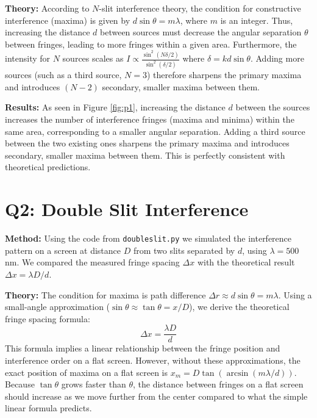 \documentclass{article}
\begin{document}
\textbf{Theory:} According to $N$-slit interference theory, the condition for constructive interference (maxima) is given by $d \sin \theta = m \lambda$, where $m$ is an integer. Thus, increasing the distance $d$ between sources must decrease the angular separation $\theta$ between fringes, leading to more fringes within a given area. Furthermore, the intensity for $N$ sources scales as $I \propto \frac{\sin^2(N \delta/2)}{\sin^2(\delta/2)}$ where $\delta = kd \sin\theta$. Adding more sources (such as a third source, $N=3$) therefore sharpens the primary maxima and introduces $(N-2)$ secondary, smaller maxima between them.

\textbf{Results:} As seen in Figure \ref{fig:p1}, increasing the distance $d$ between the sources increases the number of interference fringes (maxima and minima) within the same area, corresponding to a smaller angular separation. Adding a third source between the two existing ones sharpens the primary maxima and introduces secondary, smaller maxima between them. This is perfectly consistent with theoretical predictions.

\section*{Q2: Double Slit Interference}

\textbf{Method:} Using the code from \texttt{doubleslit.py} we simulated the interference pattern on a screen at distance $D$ from two slits separated by $d$, using $\lambda = 500$ nm. We compared the measured fringe spacing $\Delta x$ with the theoretical result $\Delta x = \lambda D / d$.

\textbf{Theory:} The condition for maxima is path difference $\Delta r \approx d \sin \theta = m \lambda$. Using a small-angle approximation ($\sin \theta \approx \tan \theta = x/D$), we derive the theoretical fringe spacing formula:
\begin{equation*}
    \Delta x = \frac{\lambda D}{d}
\end{equation*}
This formula implies a linear relationship between the fringe position and interference order on a flat screen. However, without these approximations, the exact position of maxima on a flat screen is $x_m = D \tan(\arcsin(m\lambda/d))$. Because $\tan \theta$ grows faster than $\theta$, the distance between fringes on a flat screen should increase as we move further from the center compared to what the simple linear formula predicts.
\end{document}
